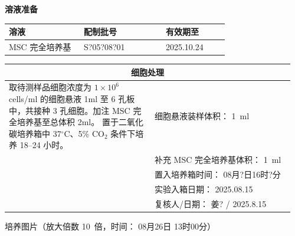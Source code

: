 \documentclass[UTF8,10pt,a4paper,fontset=fandol]{ctexart}
\newcommand{\fieldvalue}[1]{#1}
\newcommand{\handwritten}[1]{#1}
\begin{document}
\begin{center}
\textbf{溶液准备}
\end{center}

\begin{tabular}{|p{0.32\linewidth}|p{0.35\linewidth}|p{0.27\linewidth}|}
\hline
\textbf{溶液} & \textbf{配制批号} & \textbf{有效期至} \\ \hline
MSC 完全培养基 &
\fieldvalue{\handwritten{S?05?08?01}} &
\fieldvalue{\handwritten{2025.10.24}}
\\ \hline
\end{tabular}

\begin{tabular}{|p{0.49\linewidth}|p{0.47\linewidth}|}
\hline
\multicolumn{2}{|c|}{\textbf{细胞处理}} \\ \hline
取待测样品细胞浓度为 $1\times10^{6}$ cells/ml 的细胞悬液
1ml 至 6 孔板中，共接种 3 孔细胞。加注 MSC 完全培养基至总体积 2ml。
置于二氧化碳培养箱中 37$^\circ$C、5\% CO$_2$ 条件下培养 18--24 小时。 &
细胞悬液装样体积：%
\fieldvalue{\handwritten{1}}\ ml
\\
& 补充 MSC 完全培养基体积：%
\fieldvalue{\handwritten{1}}\ ml
\\
& 置入培养箱时间：%
\fieldvalue{\handwritten{08月?日16时?分}}
\\
& 实验入箱日期：%
\fieldvalue{\handwritten{2025.08.15}}
\\
& 复核人/日期：%
\fieldvalue{\handwritten{姜?}} /
\fieldvalue{\handwritten{2025.8.15}}
\\ \hline
\end{tabular}

培养图片（放大倍数 %
\fieldvalue{\handwritten{10}}\ 倍，时间：%
\fieldvalue{\handwritten{08月26日}}%
\fieldvalue{\handwritten{13时00分}}）
\par\vfill
\end{document}
